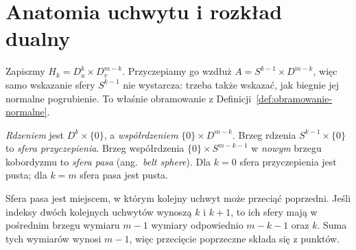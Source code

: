 \section{Anatomia uchwytu i rozkład dualny}
\label{sec:anatomia-uchwytu-18}

Zapiszmy $H_k=D^k_u\times D^{m-k}_v$.
Przyczepiamy go wzdłuż
$A=S^{k-1}\times D^{m-k}$,
więc samo wskazanie sfery $S^{k-1}$
nie wystarcza: trzeba także wskazać,
jak biegnie jej normalne pogrubienie.
To właśnie obramowanie z
Definicji~\ref{def:obramowanie-normalne}.

\begin{definicja}
\label{def:rdzen-pas-18}
\emph{Rdzeniem} jest $D^k\times\{0\}$,
a \emph{współrdzeniem} $\{0\}\times D^{m-k}$.
Brzeg rdzenia
$S^{k-1}\times\{0\}$ to \emph{sfera przyczepienia}.
Brzeg współrdzenia
$\{0\}\times S^{m-k-1}$ w \emph{nowym}
brzegu kobordyzmu to \emph{sfera pasa}
(ang.\ \emph{belt sphere}).
Dla $k=0$ sfera przyczepienia jest pusta;
dla $k=m$ sfera pasa jest pusta.
\end{definicja}

Sfera pasa jest miejscem, w którym kolejny
uchwyt może przeciąć poprzedni. Jeśli indeksy
dwóch kolejnych uchwytów wynoszą $k$ i $k+1$,
to ich sfery mają w pośrednim brzegu wymiaru
$m-1$ wymiary odpowiednio $m-k-1$ oraz $k$.
Suma tych wymiarów wynosi $m-1$, więc
przecięcie poprzeczne składa się z punktów.


